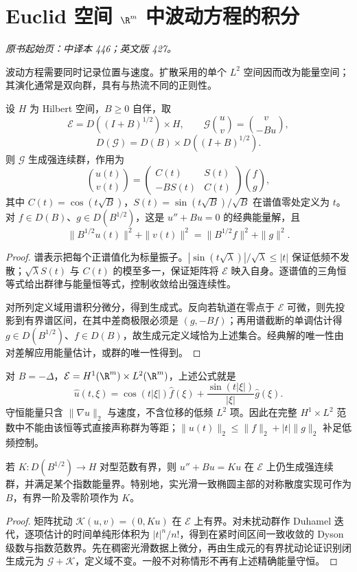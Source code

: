 \section{Euclid 空间 \texorpdfstring{$\R^m$}{Rm} 中波动方程的积分}\label{sec:yosida-14-03}
\noindent\textit{原书起始页：中译本 446；英文版 427。}

波动方程需要同时记录位置与速度。扩散采用的单个 $L^2$ 空间因而改为能量空间；其演化通常是双向群，具有与热流不同的正则性。

\begin{theorem}[能量空间中的波动群]\label{thm:y14-wave-group}
设 $H$ 为 Hilbert 空间，$B\ge0$ 自伴，取
\[
 \mathcal E=D((I+B)^{1/2})\times H,\qquad
 \mathcal G\binom uv=\binom v{-Bu},
\]
\[
 D(\mathcal G)=D(B)\times D((I+B)^{1/2}).
\]
则 $\mathcal G$ 生成强连续群，作用为
\[
 \binom{u(t)}{v(t)}=
 \begin{pmatrix}C(t)&S(t)\\-BS(t)&C(t)\end{pmatrix}\binom fg,
\]
其中 $C(t)=\cos(t\sqrt B)$，$S(t)=\sin(t\sqrt B)/\sqrt B$ 在谱值零处定义为 $t$。对 $f\in D(B)$、$g\in D(B^{1/2})$，这是 $u''+Bu=0$ 的经典能量解，且
\[
 \|B^{1/2}u(t)\|^2+\|v(t)\|^2
 =\|B^{1/2}f\|^2+\|g\|^2.
\]
\end{theorem}
\begin{proof}
谱表示把每个正谱值化为标量振子。$|\sin(t\sqrt\lambda)|/\sqrt\lambda\le|t|$ 保证低频不发散；$\sqrt\lambda S(t)$ 与 $C(t)$ 的模至多一，保证矩阵将 $\mathcal E$ 映入自身。逐谱值的三角恒等式给出群律与能量恒等式，控制收敛给出强连续性。

对所列定义域用谱积分微分，得到生成式。反向若轨道在零点于 $\mathcal E$ 可微，则先投影到有界谱区间，在其中差商极限必须是 $(g,-Bf)$；再用谱截断的单调估计得 $g\in D(B^{1/2})$、$f\in D(B)$，故生成元定义域恰为上述集合。经典解的唯一性由对差解应用能量估计，或群的唯一性得到。
\end{proof}

对 $B=-\Delta$，$\mathcal E=H^1(\R^m)\times L^2(\R^m)$，上述公式就是
\[
 \widehat u(t,\xi)=\cos(t|\xi|)\widehat f(\xi)
 +\frac{\sin(t|\xi|)}{|\xi|}\widehat g(\xi).
\]
守恒能量只含 $\|\nabla u\|_2$ 与速度，不含位移的低频 $L^2$ 项。因此在完整 $H^1\times L^2$ 范数中不能由该恒等式直接声称群为等距；$\|u(t)\|_2\le\|f\|_2+|t|\|g\|_2$ 补足低频控制。

\begin{proposition}[低阶非对称项的能量扰动]\label{prop:y14-wave-perturbation}
若 $K:D(B^{1/2})\to H$ 对型范数有界，则 $u''+Bu=Ku$ 在 $\mathcal E$ 上仍生成强连续群，并满足某个指数能量界。特别地，实光滑一致椭圆主部的对称散度实现可作为 $B$，有界一阶及零阶项作为 $K$。
\end{proposition}
\begin{proof}
矩阵扰动 $\mathcal K(u,v)=(0,Ku)$ 在 $\mathcal E$ 上有界。对未扰动群作 Duhamel 迭代，逐项估计的时间单纯形体积为 $|t|^n/n!$，得到在紧时间区间一致收敛的 Dyson 级数与指数范数界。先在稠密光滑数据上微分，再由生成元的有界扰动论证识别闭生成元为 $\mathcal G+\mathcal K$，定义域不变。一般不对称情形不再有上述精确能量守恒。
\end{proof}

